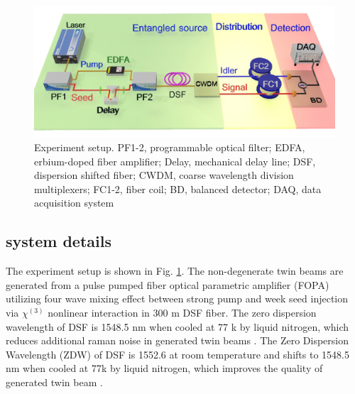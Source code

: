 \documentclass[9pt,twocolumn,twoside]{osajnl}
\begin{document}
\begin{figure}[htbp]
\centering
\includegraphics[width=\linewidth]{fig1_3d_2.jpg}
\caption{Experiment setup.
PF1-2, programmable optical filter;
EDFA, erbium-doped fiber amplifier;
Delay, mechanical delay line;
DSF, dispersion shifted fiber;
CWDM, coarse wavelength division multiplexers;
FC1-2, fiber coil;
BD, balanced detector;
DAQ, data acquisition system}
\label{fig_setup}

\end{figure}

\subsection{system details}
The experiment setup is shown in Fig. \ref{fig_setup}.
The non-degenerate twin beams are generated from a pulse pumped fiber optical parametric amplifier (FOPA) utilizing four wave mixing effect between strong pump and week seed injection via \(\chi^{(3)} \) nonlinear interaction in 300 m DSF fiber.
The zero dispersion wavelength of DSF is 1548.5 nm when cooled at 77 k by liquid nitrogen, which reduces additional raman noise in generated twin beams \cite{guo12}.
The Zero Dispersion Wavelength (ZDW) of DSF is 1552.6 at room temperature and shifts to 1548.5 nm when cooled at 77k by liquid nitrogen, which improves the quality of generated twin beam \cite{guo12}.
\end{document}
